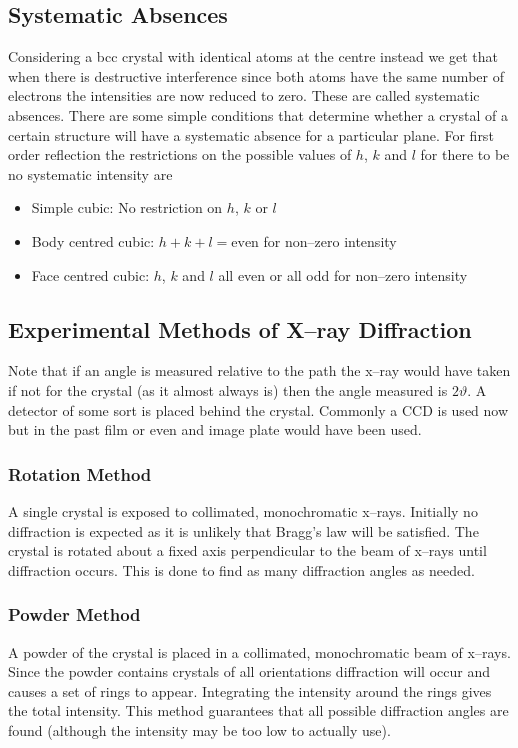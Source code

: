     \subsection{Systematic Absences}
    Considering a bcc crystal with identical atoms at the centre instead we get that when there is destructive interference since both atoms have the same number of electrons the intensities are now reduced to zero.
    These are called systematic absences.
    There are some simple conditions that determine whether a crystal of a certain structure will have a systematic absence for a particular plane.
    For first order reflection the restrictions on the possible values of \(h\), \(k\) and \(l\) for there to be no systematic intensity are
    \begin{itemize}
        \item Simple cubic: No restriction on \(h\), \(k\) or \(l\)
        \item Body centred cubic: \(h + k + l = \text{even}\) for non--zero intensity
        \item Face centred cubic: \(h\), \(k\) and \(l\) all even or all odd for non--zero intensity
    \end{itemize}
    
    \subsection{Experimental Methods of X--ray Diffraction}
    Note that if an angle is measured relative to the path the x--ray would have taken if not for the crystal (as it almost always is) then the angle measured is \(2\vartheta\).
    A detector of some sort is placed behind the crystal.
    Commonly a CCD is used now but in the past film or even and image plate would have been used.
    
    \subsubsection{Rotation Method}
    A single crystal is exposed to collimated, monochromatic x--rays.
    Initially no diffraction is expected as it is unlikely that Bragg's law will be satisfied.
    The crystal is rotated about a fixed axis perpendicular to the beam of x--rays until diffraction occurs.
    This is done to find as many diffraction angles as needed.
    
    \subsubsection{Powder Method}
    A powder of the crystal is placed in a collimated, monochromatic beam of x--rays.
    Since the powder contains crystals of all orientations diffraction will occur and causes a set of rings to appear.
    Integrating the intensity around the rings gives the total intensity.
    This method guarantees that all possible diffraction angles are found (although the intensity may be too low to actually use).
    
